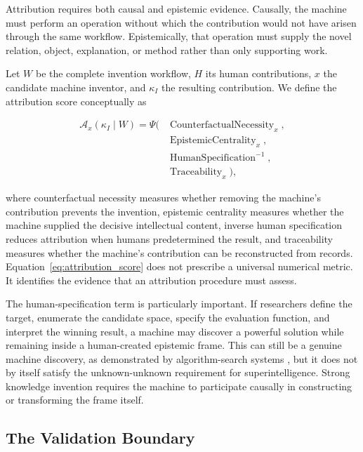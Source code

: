 Attribution requires both causal and epistemic evidence. Causally, the machine
must perform an operation without which the contribution would not have arisen
through the same workflow. Epistemically, that operation must supply the novel
relation, object, explanation, or method rather than only supporting work.

Let $W$ be the complete invention workflow, $H$ its human contributions, $x$
the candidate machine inventor, and $\kappa_I$ the resulting contribution. We
define the attribution score conceptually as

\begin{equation}
\begin{aligned}
\mathcal{A}_{x}(\kappa_I\mid W)
=\Psi(&\operatorname{CounterfactualNecessity}_{x},\\
&\operatorname{EpistemicCentrality}_{x},\\
&\operatorname{HumanSpecification}^{-1},\\
&\operatorname{Traceability}_{x}),
\end{aligned}
\label{eq:attribution_score}
\end{equation}

where counterfactual necessity measures whether removing the machine's
contribution prevents the invention, epistemic centrality measures whether the
machine supplied the decisive intellectual content, inverse human specification
reduces attribution when humans predetermined the result, and traceability
measures whether the machine's contribution can be reconstructed from records.
Equation~\eqref{eq:attribution_score} does not prescribe a universal numerical
metric. It identifies the evidence that an attribution procedure must assess.

The human-specification term is particularly important. If researchers define
the target, enumerate the candidate space, specify the evaluation function, and
interpret the winning result, a machine may discover a powerful solution while
remaining inside a human-created epistemic frame. This can still be a genuine
machine discovery, as demonstrated by algorithm-search systems
\cite{fawzi2022alphatensor,mankowitz2023alphadev}, but it does not by itself
satisfy the unknown-unknown requirement for superintelligence. Strong knowledge
invention requires the machine to participate causally in constructing or
transforming the frame itself.

\subsection{\textbf{The Validation Boundary}}

